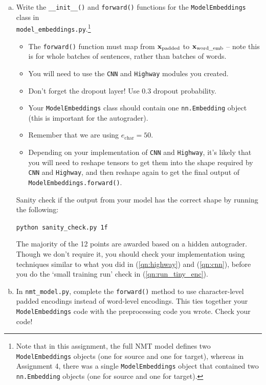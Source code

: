 \begin{enumerate}[(a)]
    \item {} Write the \texttt{\_\_init\_\_()} and \texttt{forward()} functions for the \texttt{ModelEmbeddings} class in \\
    \texttt{model\_embeddings.py}.\footnote{Note that in this assignment, the full NMT model defines two \texttt{ModelEmbeddings} objects (one for source and one for target), whereas in Assignment 4, there was a single \texttt{ModelEmbeddings} object that contained two \texttt{nn.Embedding} objects (one for source and one for target).} 
    \begin{itemize}
        \item The \texttt{forward()} function must map from $\mathbf{x}_\text{padded}$ to $\mathbf{x}_\text{word\_emb}$ -- note this is for whole batches of sentences, rather than batches of words.
        \item You will need to use the \texttt{CNN} and \texttt{Highway} modules you created.
        \item Don't forget the dropout layer! Use 0.3 dropout probability.
        \item Your \texttt{ModelEmbeddings} class should contain one \texttt{nn.Embedding} object (this is important for the autograder).
        \item Remember that we are using $e_\text{char}=50$.
        \item Depending on your implementation of \texttt{CNN} and \texttt{Highway}, it's likely that you will need to reshape tensors to get them into the shape required by \texttt{CNN} and \texttt{Highway}, and then reshape again to get the final output of \texttt{ModelEmbeddings.forward()}.
    \end{itemize}
    Sanity check if the output from your model has the correct shape by running the following:
    \begin{center}
        \texttt{python sanity\_check.py 1f}
    \end{center}
    The majority of the 12 points are awarded based on a hidden autograder. Though we don't require it, you should check your implementation using techniques similar to what you did in (\ref{qn:highway}) and (\ref{qn:cnn}), before you do the `small training run' check in (\ref{qn:run_tiny_enc}). 

    \item {}
    In \texttt{nmt\_model.py}, complete the \texttt{forward()} method to use character-level padded encodings instead of word-level encodings.
    This ties together your \texttt{ModelEmbeddings} code with the preprocessing code you wrote. Check your code!
    

\end{enumerate}
